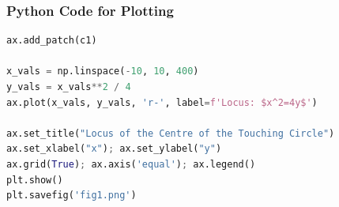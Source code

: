 \documentclass{beamer}
\theoremstyle{remark}
\numberwithin{equation}{section}
\begin{document}
\begin{frame}[fragile]
\frametitle{Python Code for Plotting}
\begin{lstlisting}[language=Python]
ax.add_patch(c1)
 
x_vals = np.linspace(-10, 10, 400)
y_vals = x_vals**2 / 4
ax.plot(x_vals, y_vals, 'r-', label=f'Locus: $x^2=4y$')

ax.set_title("Locus of the Centre of the Touching Circle")
ax.set_xlabel("x"); ax.set_ylabel("y")
ax.grid(True); ax.axis('equal'); ax.legend()
plt.show()
plt.savefig('fig1.png')
\end{lstlisting}
\end{frame}
\end{document}
